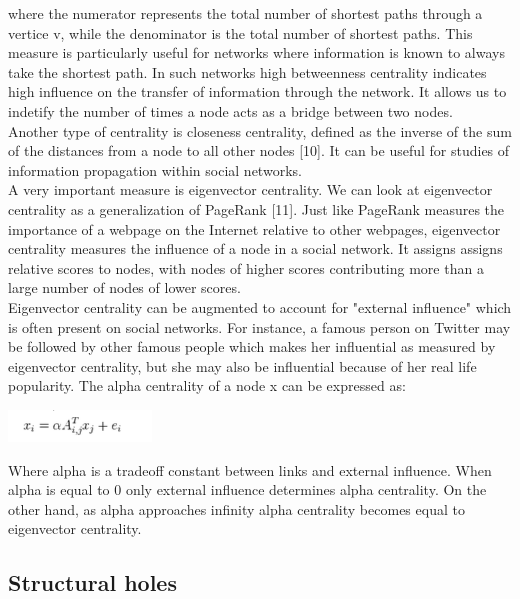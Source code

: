 \documentclass[conference,letterpaper]{IEEEtran}
\begin{document}
where the numerator represents the total number of shortest paths through a vertice v, while the denominator is the total number of shortest paths. This measure is particularly useful for networks where information is known to always take the shortest path. In such networks high betweenness centrality indicates high influence on the transfer of information through the network. It allows us to indetify the number of times a node acts as a bridge between two nodes.\\
Another type of centrality is closeness centrality, defined as the inverse of the sum of the distances from a node to all other nodes [10]. It can be useful for studies of information propagation within social networks.\\
A very important measure is eigenvector centrality. We can look at eigenvector centrality as a generalization of PageRank [11]. Just like PageRank measures the importance of a webpage on the Internet relative to other webpages, eigenvector centrality measures the influence of a node in a social network. It assigns assigns relative scores to nodes, with nodes of higher scores contributing more than a large number of nodes of lower scores. \\
Eigenvector centrality can be augmented to account for "external influence" which is often present on social networks. For instance, a famous person on Twitter may be followed by other famous people which makes her influential as measured by eigenvector centrality, but she may also be influential because of her real life popularity. The alpha centrality of a node x can be expressed as:\\

\centerline{
  \includegraphics[width=1.5in]{alpha_centrality.png}
}

Where alpha is a tradeoff constant between links and external influence. When alpha is equal to 0 only external influence determines alpha centrality. On the other hand, as alpha approaches infinity alpha centrality becomes equal to eigenvector centrality.\\

\subsection{Structural holes}
\end{document}
